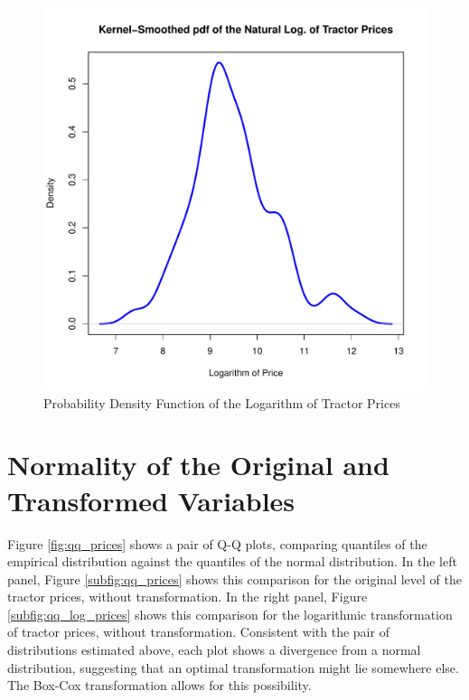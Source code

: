 \begin{figure}[h!]
  \centering
  \includegraphics[scale = 0.5, keepaspectratio=true]{../Figures/density_log_prices}
  \caption{Probability Density Function of the Logarithm of Tractor Prices} \label{fig:density_log_prices}
\end{figure}




\pagebreak
\section{Normality of the Original and Transformed Variables}

Figure \ref{fig:qq_prices} shows a pair of Q-Q plots, 
comparing quantiles of the empirical distribution against
the quantiles of the normal distribution. 
In the left panel, Figure \ref{subfig:qq_prices} shows this comparison 
for the original level of the tractor prices, without transformation. 
In the right panel, Figure \ref{subfig:qq_log_prices} shows this comparison 
for the logarithmic transformation of tractor prices, without transformation. 
Consistent with the pair of distributions estimated above, 
each plot shows a divergence from a normal distribution,
suggesting that an optimal transformation might lie somewhere else.
The Box-Cox transformation allows for this possibility. 


